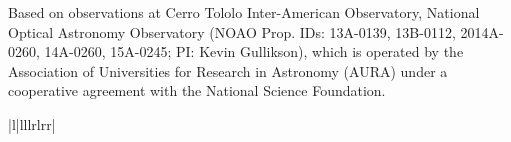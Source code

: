 \documentclass{emulateapj}
\begin{document}
Based on observations at Cerro Tololo Inter-American Observatory, National Optical Astronomy Observatory (NOAO Prop. IDs: 13A-0139, 13B-0112, 2014A-0260, 14A-0260, 15A-0245; PI: Kevin Gullikson), which is operated by the Association of Universities for Research in Astronomy (AURA) under a cooperative agreement with the National Science Foundation. 





\LongTables
\begin{deluxetable*}{|l|lllrlrr|}
\tabletypesize{\small}
\tablewidth{0pt}
       

\end{deluxetable*}
\end{document}
